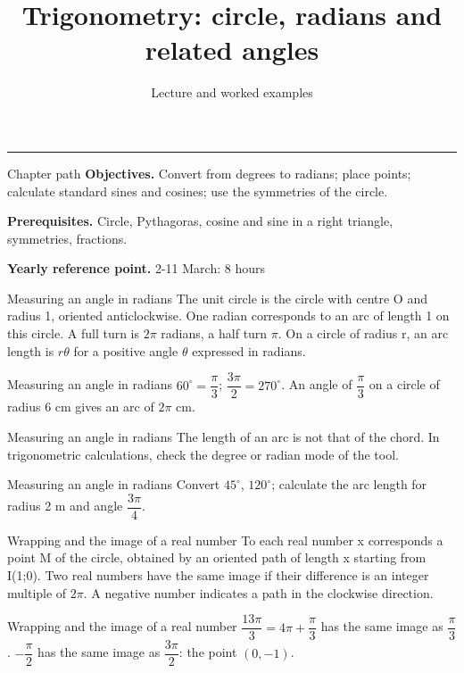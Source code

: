 \documentclass[aspectratio=169,10pt]{beamer}
\title{Trigonometry: circle, radians and related angles}
\subtitle{Lecture and worked examples}
\date{}
\author{}
\begin{document}
\begin{frame}[plain]
\vfill
{\inserttitle\par}
\medskip
{\insertsubtitle\par}
\medskip
{\rule{\textwidth}{.5pt}}
\vfill
\end{frame}
\begin{frame}{Chapter path}
\textbf{Objectives.} Convert from degrees to radians; place points; calculate standard sines and cosines; use the symmetries of the circle.

\textbf{Prerequisites.} Circle, Pythagoras, cosine and sine in a right triangle, symmetries, fractions.

\textbf{Yearly reference point.} 2-11 March: 8 hours
\end{frame}
\begin{frame}{Measuring an angle in radians}
The unit circle is the circle with centre O and radius 1, oriented anticlockwise. One radian corresponds to an arc of length 1 on this circle. A full turn is \(2\pi\) radians, a half turn \(\pi\). On a circle of radius r, an arc length is \(r\theta\) for a positive angle \(\theta\) expressed in radians.
\end{frame}
\begin{frame}{Measuring an angle in radians}
\(60^\circ =\dfrac{\pi}{3}\); \(\dfrac{3\pi}{2}=270^\circ \). An angle of \(\dfrac{\pi}{3}\) on a circle of radius 6 cm gives an arc of \(2\pi\) cm.
\end{frame}
\begin{frame}{Measuring an angle in radians}
The length of an arc is not that of the chord. In trigonometric calculations, check the degree or radian mode of the tool.
\end{frame}
\begin{frame}{Measuring an angle in radians}
Convert \(45^\circ\), \(120^\circ\); calculate the arc length for radius 2 m and angle \(\dfrac{3\pi}{4}\).
\end{frame}
\begin{frame}{Wrapping and the image of a real number}
To each real number x corresponds a point M of the circle, obtained by an oriented path of length x starting from I(1;0). Two real numbers have the same image if their difference is an integer multiple of \(2\pi\). A negative number indicates a path in the clockwise direction.
\end{frame}
\begin{frame}{Wrapping and the image of a real number}
\(\dfrac{13\pi}{3}=4\pi +\dfrac{\pi}{3}\) has the same image as \(\dfrac{\pi}{3}\). \(-\dfrac{\pi}{2}\) has the same image as \(\dfrac{3\pi}{2}\): the point \((0,-1)\).
\end{frame}
\end{document}
